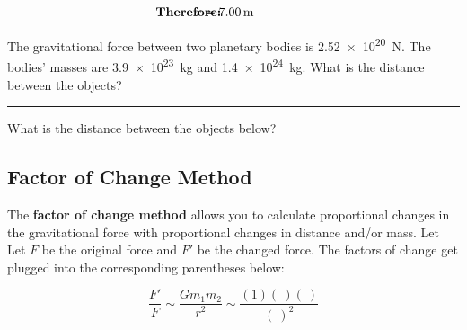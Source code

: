 \documentclass[main-physics.tex]{subfiles}
\begin{document}
\begin{align*}
    \hspace{-3.5em} & \textbf{Therefore:} & \hspace{-3em} &
    r = \SI{7.00}{m}
\end{align*}


\begin{exercise} \label{dKPTLZ}
The gravitational force between two planetary bodies is \SI{2.52e20}{N}. The bodies' masses are \SI{3.9e23}{kg} and \SI{1.4e24}{kg}. What is the distance between the objects?
\end{exercise}


\hrule

\begin{exercise} \label{zw3NbF}
What is the distance between the objects below?

\begin{center}
    \centering
\end{center}
\end{exercise}

\cyanhrule

\subsection{Factor of Change Method}

The \textbf{factor of change method} allows you to calculate proportional changes in the gravitational force with proportional changes in distance and/or mass. Let Let $F$ be the original force and $F'$ be the changed force. The factors of change get plugged into the corresponding parentheses below:

\begin{equation*}
    \frac{F'}{F} \sim \frac{G m_1 m_2}{r^2} \sim \frac{(1)(\ )(\ )}{(\ )^2}
\end{equation*}
\end{document}
